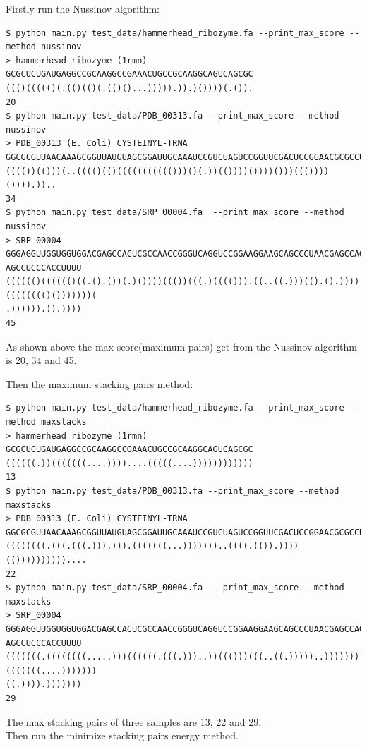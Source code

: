 \documentclass[10pt]{article}
\begin{document}
Firstly run the Nussinov algorithm:
\begin{lstlisting}[frame=single,breaklines=false]
$ python main.py test_data/hammerhead_ribozyme.fa --print_max_score --method nussinov
> hammerhead ribozyme (1rmn)
GCGCUCUGAUGAGGCCGCAAGGCCGAAACUGCCGCAAGGCAGUCAGCGC
((()((((()(.(()(()(.(()()...))))).)).)())))(.()).
20
$ python main.py test_data/PDB_00313.fa --print_max_score --method nussinov
> PDB_00313 (E. Coli) CYSTEINYL-TRNA
GGCGCGUUAACAAAGCGGUUAUGUAGCGGAUUGCAAAUCCGUCUAGUCCGGUUCGACUCCGGAACGCGCCUCCA
(((())(()))(..(((()(()((((((((((()))()(.))(())))())))()))((())))()))).))..
34
$ python main.py test_data/SRP_00004.fa  --print_max_score --method nussinov
> SRP_00004
GGGAGGUUGGUGGUGGACGAGCCACUCGCCAACCGGGUCAGGUCCGGAAGGAAGCAGCCCUAACGAGCCAGGCACGGGUCGCCGUGCC
AGCCUCCCACCUUUU
(((((()(((((()((.().())(.)())))((())(((.)(((())).((..((.)))(().().))))(((((((()()))))))(
.)))))).)).))))
45
\end{lstlisting}

\noindent
As shown above the max score(maximum pairs) get from the Nussinov algorithm is 20, 34 and 45.\\

\pagebreak

\noindent
Then the maximum stacking pairs method:

\begin{lstlisting}[frame=single,breaklines=false]
$ python main.py test_data/hammerhead_ribozyme.fa --print_max_score --method maxstacks
> hammerhead ribozyme (1rmn)
GCGCUCUGAUGAGGCCGCAAGGCCGAAACUGCCGCAAGGCAGUCAGCGC
((((((.))(((((((....))))....(((((....))))))))))))
13
$ python main.py test_data/PDB_00313.fa --print_max_score --method maxstacks
> PDB_00313 (E. Coli) CYSTEINYL-TRNA
GGCGCGUUAACAAAGCGGUUAUGUAGCGGAUUGCAAAUCCGUCUAGUCCGGUUCGACUCCGGAACGCGCCUCCA
((((((((.(((.(((.))).))).(((((((...)))))))..((((.(()).))))(())))))))))....
22
$ python main.py test_data/SRP_00004.fa  --print_max_score --method maxstacks
> SRP_00004
GGGAGGUUGGUGGUGGACGAGCCACUCGCCAACCGGGUCAGGUCCGGAAGGAAGCAGCCCUAACGAGCCAGGCACGGGUCGCCGUGCC
AGCCUCCCACCUUUU
(((((((.((((((((.....)))((((((.(((.)))..))((()))(((..((.)))))..)))))))(((((((....)))))))
((.)))).)))))))
29
\end{lstlisting}

\noindent
The max stacking pairs of three samples are 13, 22 and 29.\\

\noindent
Then run the minimize stacking pairs energy method.
\end{document}
